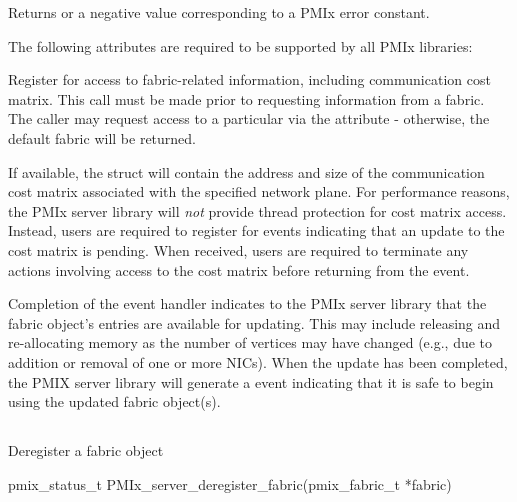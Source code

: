Returns  or a negative value corresponding to a \ac{PMIx} error constant.

\reqattrstart
The following attributes are required to be supported by all \ac{PMIx} libraries:


\reqattrend

\descr

Register for access to fabric-related information, including communication cost matrix. This call must be made prior to requesting information from a fabric. The caller may request access to a particular  via the  attribute - otherwise, the default fabric will be returned.

If available, the  struct will contain the address and size of the communication cost matrix associated with the specified network plane. For performance reasons, the \ac{PMIx} server library will \emph{not} provide thread protection for cost matrix access. Instead, users are required to register for  events indicating that an update to the cost matrix is pending. When received, users are required to terminate any actions involving access to the cost matrix before returning from the event.

Completion of the  event handler indicates to the \ac{PMIx} server library that the fabric object's entries are available for updating. This may include releasing and re-allocating memory as the number of vertices may have changed (e.g., due to addition or removal of one or more \acp{NIC}). When the update has been completed, the \ac{PMIX} server library will generate a  event indicating that it is safe to begin using the updated fabric object(s).

\subsection{}

\summary

Deregister a fabric object

\format

\cspecificstart
\begin{codepar}
pmix_status_t PMIx_server_deregister_fabric(pmix_fabric_t *fabric)
\end{codepar}
\cspecificend

